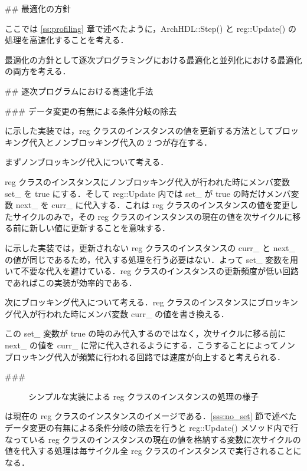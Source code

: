## 最適化の方針

ここでは \ref{ss:profiling} 章で述べたように，ArchHDL::Step() と reg::Update() の処理を高速化することを考える．

最適化の方針として逐次プログラミングにおける最適化と並列化における最適化の両方を考える．


## 逐次プログラムにおける高速化手法

### データ変更の有無による条件分岐の除去 \label{sss:no_set}

 に示した実装では，reg クラスのインスタンスの値を更新する方法としてブロッキング代入とノンブロッキング代入の 2 つが存在する．

まずノンブロッキング代入について考える．

reg クラスのインスタンスにノンブロッキング代入が行われた時にメンバ変数 set_ を true にする．そして reg::Update 内では set_ が true の時だけメンバ変数 next_ を curr_ に代入する．これは reg クラスのインスタンスの値を変更したサイクルのみで，その reg クラスのインスタンスの現在の値を次サイクルに移る前に新しい値に更新することを意味する．

 に示した実装では，更新されない reg クラスのインスタンスの curr_ と next_ の値が同じであるため，代入する処理を行う必要はない．よって set_ 変数を用いて不要な代入を避けている．reg クラスのインスタンスの更新頻度が低い回路であればこの実装が効率的である．

次にブロッキング代入について考える．reg クラスのインスタンスにブロッキング代入が行われた時にメンバ変数 curr_ の値を書き換える．

この set_ 変数が true の時のみ代入するのではなく，次サイクルに移る前に next_ の値を curr_ に常に代入されるようにする．こうすることによってノンブロッキング代入が頻繁に行われる回路では速度が向上すると考えられる．


###  \label{sss:mem_copy}

\begin{figure}[t]
 \begin{center}
  
 \end{center}
 \caption{シンプルな実装による reg クラスのインスタンスの処理の様子}
 \label{fig:regs}
\end{figure}

 は現在の reg クラスのインスタンスのイメージである．\ref{sss:no_set} 節で述べたデータ変更の有無による条件分岐の除去を行うと reg::Update() メソッド内で行なっている reg クラスのインスタンスの現在の値を格納する変数に次サイクルの値を代入する処理は毎サイクル全 reg クラスのインスタンスで実行されることになる．

